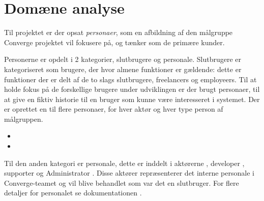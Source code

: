 \section{Domæne analyse}

Til projektet er der opsat \emph{personaer}, som en afbildning af den målgruppe Converge projektet vil fokusere på, og tænker som de primære kunder.

Personerne er opdelt i 2 kategorier, slutbrugere og personale. Slutbrugere er kategoriseret som brugere, der hvor almene funktioner er gældende: dette er funktioner der er delt af de to slags slutbrugere, freelancers og employeers.  Til at holde fokus på de forskellige brugere under udviklingen er der brugt personaer, til at give en fiktiv historie til en bruger som kunne være interesseret i systemet. Der er oprettet en til flere personaer, for hver aktør og hver type person af målgruppen.

\begin{itemize}
    \item {}
    \item {}
\end{itemize}

Til den anden kategori er personale, dette er inddelt i aktørerne , developer , supporter  og Administrator . Disse aktører repræsenterer det interne personale i Converge-teamet og vil blive behandlet som var det en slutbruger. For flere detaljer for personalet se dokumentationen \cite[Funktionelle krav]{doocumentation-kravspec}. 
